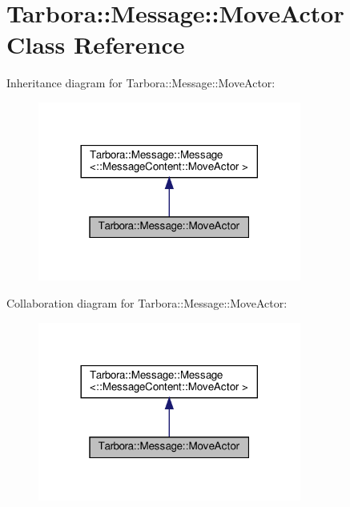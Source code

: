 \hypertarget{classTarbora_1_1Message_1_1MoveActor}{}\section{Tarbora\+:\+:Message\+:\+:Move\+Actor Class Reference}
\label{classTarbora_1_1Message_1_1MoveActor}


Inheritance diagram for Tarbora\+:\+:Message\+:\+:Move\+Actor\+:
\nopagebreak
\begin{figure}[H]
\begin{center}
\leavevmode
\includegraphics[width=245pt]{classTarbora_1_1Message_1_1MoveActor__inherit__graph}
\end{center}
\end{figure}


Collaboration diagram for Tarbora\+:\+:Message\+:\+:Move\+Actor\+:
\nopagebreak
\begin{figure}[H]
\begin{center}
\leavevmode
\includegraphics[width=245pt]{classTarbora_1_1Message_1_1MoveActor__coll__graph}
\end{center}
\end{figure}
